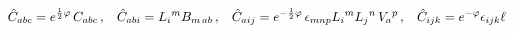 \begin{equation}
\hat{C}_{abc} =  e^{\frac{1}{2}\varphi}\, C_{abc}\, ,
\hspace{.3cm}
\hat{C}_{abi} =  L_{i}{}^{m}B_{m\, ab}\, ,
\hspace{.3cm}
\hat{C}_{aij} = 
 e^{-\frac{1}{2}\varphi}\, \epsilon_{mnp} L_{i}{}^{m} L_{j}{}^{n}\, V_a{}^p \, ,
\hspace{.3cm} \hat{C}_{ijk}= e^{-\varphi}\epsilon_{ijk} \ell \,
\end{equation}

